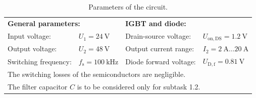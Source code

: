 \begin{table}[ht]
	\centering  %
	\begin{tabular}{llll}
		\toprule
		\multicolumn{2}{l}{\textbf{General parameters:}} & \multicolumn{2}{l}{\textbf{IGBT and diode:}}                                                                            \\
		Input voltage:                                   & $U_{\mathrm{1}} = \SI{24}{\volt}$            & Drain-source voltage:  & $U_{\mathrm{on},\mathrm{DS}} = \SI{1.2}{\volt}$ \\
		Output voltage:                                  & $U_2 = \SI{48}{\volt}$                       & Output current range:  & $I_2 = \SI{2}{\ampere} \ldots \SI{20}{\ampere}$ \\
		Switching frequency:                             & $f_\mathrm{s} = \SI{100}{\kilo\hertz}$       & Diode forward voltage: & $U_{\mathrm{D},\mathrm{f}} = \SI{0.81}{\volt}$  \\
		\midrule
		\multicolumn{4}{l}{\quad The switching losses of the semiconductors are negligible.}                                                                                       \\
		\multicolumn{4}{l}{\quad The filter capacitor $C$ is to be considered only for subtask 1.2.}                                                                               \\
		\bottomrule
	\end{tabular}
	\caption{Parameters of the circuit.}  %
	\label{table:ex01_Parameters of the circuit}
\end{table}



